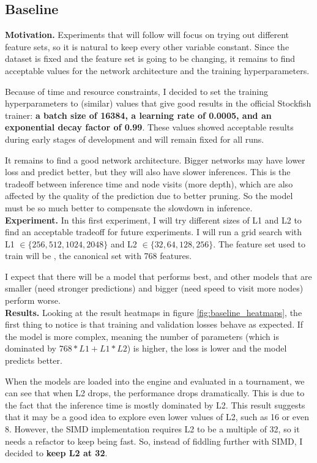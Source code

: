 \subsection{Baseline}

\textbf{Motivation.} Experiments that will follow will focus on trying out different feature sets, so it is natural to keep every other variable constant. Since the dataset is fixed and the feature set is going to be changing, it remains to find acceptable values for the network architecture and the training hyperparameters. 

Because of time and resource constraints, I decided to set the training hyperparameters to (similar) values that give good results in the official Stockfish trainer: \textbf{a batch size of 16384, a learning rate of 0.0005, and an exponential decay factor of 0.99}. These values showed acceptable results during early stages of development and will remain fixed for all runs.

It remains to find a good network architecture. Bigger networks may have lower loss and predict better, but they will also have slower inferences. This is the tradeoff between inference time and node visits (more depth), which are also affected by the quality of the prediction due to better pruning. So the model must be so much better to compensate the slowdown in inference. \\

\textbf{Experiment.}  In this first experiment, I will try different sizes of L1 and L2 to find an acceptable tradeoff for future experiments. I will run a grid search with L1 $\in \{256, 512, 1024, 2048\}$ and L2 $\in \{32, 64, 128, 256\}$. The feature set used to train will be , the canonical set with 768 features.

I expect that there will be a model that performs best, and other models that are smaller (need stronger predictions) and bigger (need speed to visit more nodes) perform worse. \\

\textbf{Results.} Looking at the result heatmaps in figure \ref{fig:baseline_heatmaps}, the first thing to notice is that training and validation losses behave as expected. If the model is more complex, meaning the number of parameters (which is dominated by $768*L1+L1*L2$) is higher, the loss is lower and the model predicts better.

When the models are loaded into the engine and evaluated in a tournament, we can see that when L2 drops, the performance drops dramatically. This is due to the fact that the inference time is mostly dominated by L2. This result suggests that it may be a good idea to explore even lower values of L2, such as 16 or even 8. However, the SIMD implementation requires L2 to be a multiple of 32, so it needs a refactor to keep being fast. So, instead of fiddling further with SIMD, I decided to \textbf{keep L2 at 32}.

